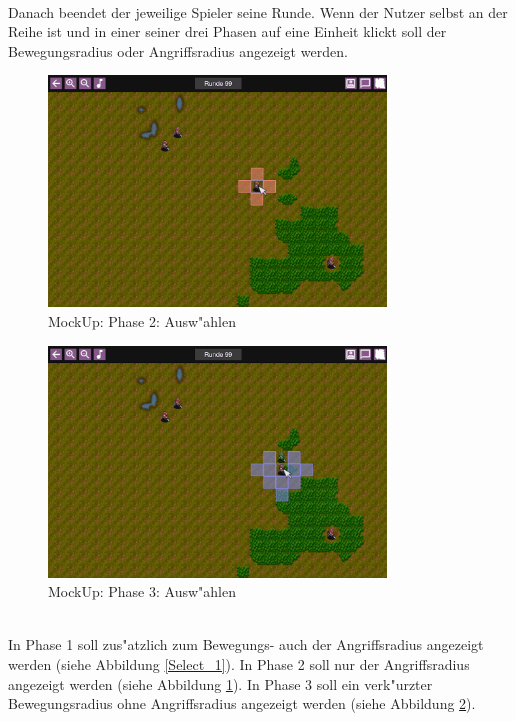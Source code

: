 \documentclass[12pt, titlepage]{scrartcl}
\begin{document}
			        \ \\ Danach beendet der jeweilige Spieler seine Runde. Wenn der Nutzer selbst an der Reihe ist und in einer seiner drei Phasen auf eine Einheit klickt soll der Bewegungsradius oder Angriffsradius angezeigt werden. \\
                    \begin{figure}[H] 
    				    \centering
    				    \includegraphics[width=0.8\textwidth]{images/mockUps/ClickUnitAttackPhase.png}
    				    \caption{MockUp: Phase 2: Ausw"ahlen}
    				    \label{Select_2}
			        \end{figure} 
			        \begin{figure}[H] 
    				    \centering
    				    \includegraphics[width=0.8\textwidth]{images/mockUps/ClickUnitRestMovePhase.png}
    				    \caption{MockUp: Phase 3: Ausw"ahlen}
    				    \label{Select_3}
			        \end{figure} 
		            \ \\ In Phase 1 soll zus"atzlich zum Bewegungs- auch der Angriffsradius angezeigt werden (siehe Abbildung \ref{Select_1}). In Phase 2 soll nur der Angriffsradius angezeigt werden (siehe Abbildung \ref{Select_2}). In Phase 3 soll ein verk"urzter Bewegungsradius ohne Angriffsradius angezeigt werden (siehe Abbildung \ref{Select_3}).
\end{document}
